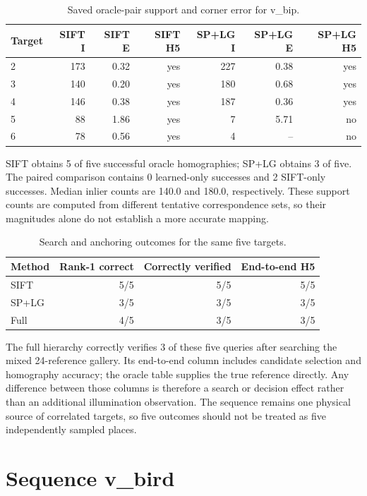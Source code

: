 \begin{table}[H]\centering\small
\caption{Saved oracle-pair support and corner error for v\_bip.}\label{tab:hp-pairs-21}
\begin{tabular}{lrrrrrr}\toprule
Target & SIFT I & SIFT E & SIFT H5 & SP+LG I & SP+LG E & SP+LG H5 \\
\midrule
2 & 173 & 0.32 & yes & 227 & 0.38 & yes \\
3 & 140 & 0.20 & yes & 180 & 0.68 & yes \\
4 & 146 & 0.38 & yes & 187 & 0.36 & yes \\
5 & 88 & 1.86 & yes & 7 & 5.71 & no \\
6 & 78 & 0.56 & yes & 4 & -- & no \\
\bottomrule\end{tabular}\end{table}


SIFT obtains 5 of five successful oracle homographies; SP+LG obtains 3 of five. The paired comparison contains 0 learned-only successes and 2 SIFT-only successes. Median inlier counts are 140.0 and 180.0, respectively. These support counts are computed from different tentative correspondence sets, so their magnitudes alone do not establish a more accurate mapping.

\begin{table}[H]\centering\small
\caption{Search and anchoring outcomes for the same five targets.}\label{tab:hp-end-21}
\begin{tabular}{lrrr}\toprule
Method & Rank-1 correct & Correctly verified & End-to-end H5 \\
\midrule
SIFT & 5/5 & 5/5 & 5/5 \\
SP+LG & 3/5 & 3/5 & 3/5 \\
Full & 4/5 & 3/5 & 3/5 \\
\bottomrule\end{tabular}\end{table}


The full hierarchy correctly verifies 3 of these five queries after searching the mixed 24-reference gallery. Its end-to-end column includes candidate selection and homography accuracy; the oracle table supplies the true reference directly. Any difference between those columns is therefore a search or decision effect rather than an additional illumination observation. The sequence remains one physical source of correlated targets, so five outcomes should not be treated as five independently sampled places.

\section{Sequence v\_bird}

